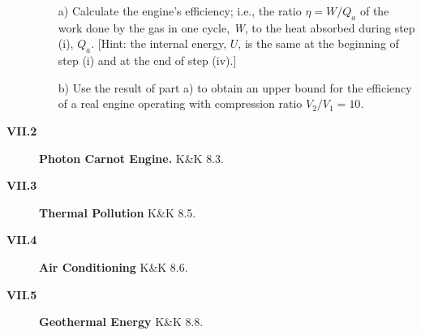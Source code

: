 \documentclass[11pt]{article}
\begin{document}
\begin{description}
\begin{itemize}
\item[a)] 
Calculate the engine's efficiency; i.e.,
the ratio ${\eta} = {W}/{Q}_{a}$  
of the work done by the gas in one cycle, 
{\it W}, to the heat absorbed 
during step (i), ${Q}_{a}$. 
[Hint:  the internal energy, ${U}$,
is the same at the beginning of step (i) 
and at the end of step (iv).]
\item[b)] 
Use the result of part a) to obtain an upper bound for
the efficiency of a real engine operating with
compression ratio $V_2/V_1 = 10$.
\end{itemize}

\item[{\bf VII.2} ] {\bf Photon Carnot Engine.} K\&K 8.3.

\item[{\bf VII.3} ] {\bf Thermal Pollution} K\&K 8.5.

\item[{\bf VII.4} ] {\bf Air Conditioning} K\&K 8.6.

\item[{\bf VII.5} ] {\bf Geothermal Energy} K\&K 8.8.


\end{description}
\end{document}
